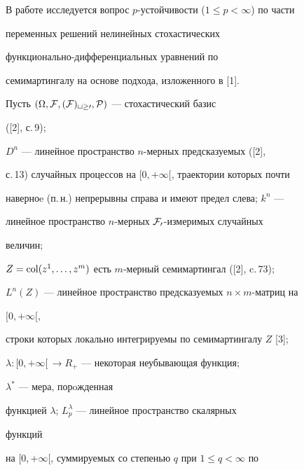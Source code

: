 \pagestyle{plain} %


 




\maketitle 


\label{begin} 


 


В работе исследуется вопрос $p$-устойчивости ($1\le p<\infty$) по части 


переменных решений нелинейных стохастических 


функционально-дифференциальных уравнений по 


семимартингалу на основе подхода, изложенного в [1]. 


 


Пусть $(\Omega,\cal F,(\cal F)_{t\ge0},P)$ --- стохастический базис 


([2], с.\,9); 


$D^n$ --- линейное пространство $n$-мерных предсказуемых ([2], 


с.\,13) случайных процессов на $[0,+\infty[$, траектории которых почти 


наверноe (п.\,н.) непрерывны справа и имеют предел слева; $k^n$ --- 


линейное пространство $n$-мерных $\cal F_0$-измеримых случайных 


величин; 


$Z=\operatorname{col}(z^1,\dotsc,z^m)$ есть $m$-мерный семимартингал ([2], c.\,73); 


$L^n(Z)$ --- линейное пространство предсказуемых $n\times m$-матриц на 


$[0,+\infty[$, 


строки которых локально интегрируемы по семимартингалу $Z$ [3]; 


$\lambda:[0,+\infty[\,\to R_+$ --- некоторая неубывающая функция; 


$\lambda^*$ --- мера, порoжденная 


функцией $\lambda$; $L^\lambda_p$ --- линейное пространство скалярных 


функций 


на $[0,+\infty[$, суммируемых со степенью $q$ при $1\le q<\infty$ по 


